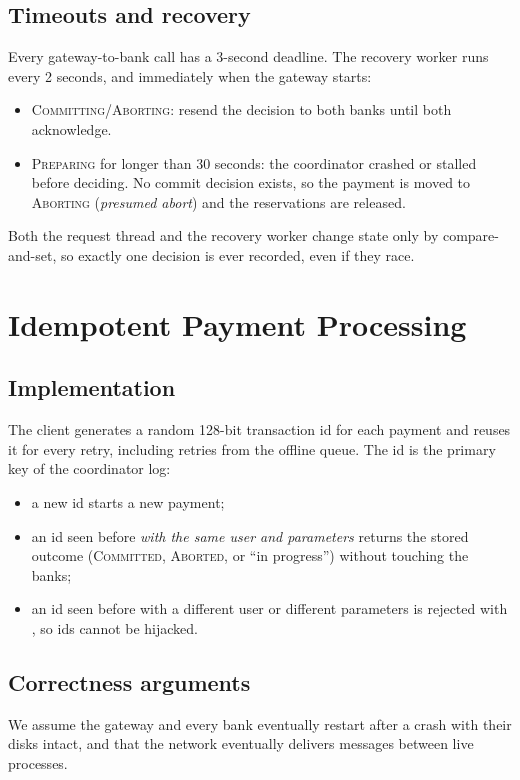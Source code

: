 \documentclass[11pt]{article}
\newcommand{\code}[1]{\texttt{\detokenize{#1}}}
\newcommand{\st}[1]{\textsc{#1}}
\begin{document}
\subsection{Timeouts and recovery}
\label{sec:recovery}
Every gateway-to-bank call has a 3-second deadline. The recovery worker runs
every 2 seconds, and immediately when the gateway starts:
\begin{itemize}
  \item \st{Committing}/\st{Aborting}: resend the decision to both banks until
        both acknowledge.
  \item \st{Preparing} for longer than 30 seconds: the coordinator crashed or
        stalled before deciding. No commit decision exists, so the payment is
        moved to \st{Aborting} (\emph{presumed abort}) and the reservations are
        released.
\end{itemize}
Both the request thread and the recovery worker change state only by
compare-and-set, so exactly one decision is ever recorded, even if they race.

\section{Idempotent Payment Processing}

\subsection{Implementation}
The client generates a random 128-bit transaction id for each payment and
reuses it for every retry, including retries from the offline queue. The id is
the primary key of the coordinator log:
\begin{itemize}
  \item a new id starts a new payment;
  \item an id seen before \emph{with the same user and parameters} returns the
        stored outcome (\st{Committed}, \st{Aborted}, or ``in progress'')
        without touching the banks;
  \item an id seen before with a different user or different parameters is
        rejected with \code{ALREADY_EXISTS}, so ids cannot be hijacked.
\end{itemize}

\subsection{Correctness arguments}
We assume the gateway and every bank eventually restart after a crash with
their disks intact, and that the network eventually delivers messages between
live processes.
\end{document}

